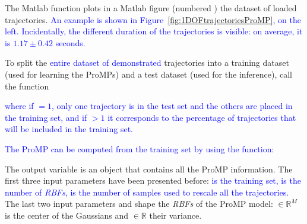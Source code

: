 \documentclass[utf8]{frontiersSCNS} %
\newcommand{\rev}[1]{\textcolor{blue}{#1}}
\begin{document}

The Matlab function  plots in a Matlab figure (numbered ) the dataset of loaded trajectories. %
\rev{An example is shown in Figure~\ref{fig:1DOFtrajectoriesProMP}, on the left. Incidentally, the different duration of the trajectories is visible: on average, it is $1.17 \pm 0.42$ seconds.}



To split the \rev{entire dataset of demonstrated} trajectories  
into a training dataset (used for learning the ProMPs) and a test dataset (used for the inference), call the function

\rev{where if $=1$, only one trajectory is in the test set and the others are placed in the training set, and if \mcode{partitionType}$ >1$ it corresponds to the percentage of trajectories that will be included in the training set.} 

\rev{The ProMP can be computed from the training set by using the function}:


The output variable  is an object that contains all the ProMP information. 
The first three input parameters have been presented before: \rev{ is the training set,  is the number of \textit{RBFs}, \mcode{s_ref} is the number of samples used to rescale all the trajectories.}
The last two input parameters  and  shape the \textit{RBFs} of the ProMP model:  $\in \mathbb{R}^M$ is the center of the Gaussians and  $\in \mathbb{R}$ their variance. 
\end{document}
